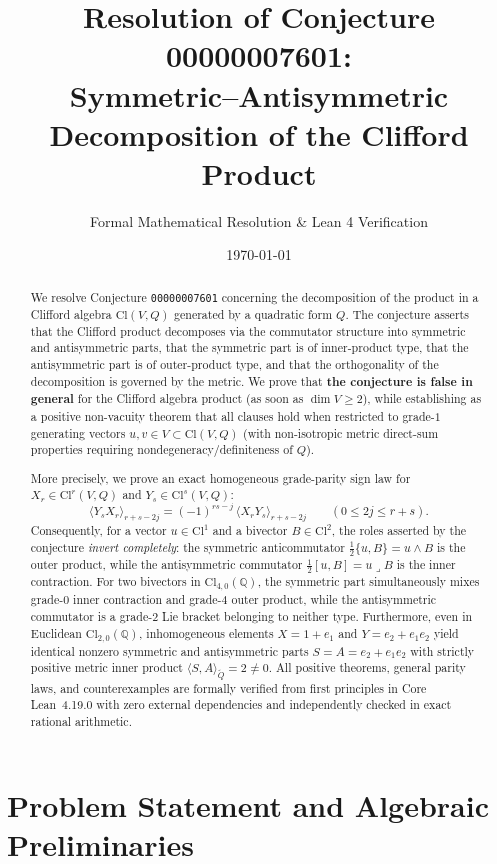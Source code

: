 \documentclass[11pt]{article}
\title{\textbf{Resolution of Conjecture 00000007601:\\
Symmetric--Antisymmetric Decomposition of the Clifford Product}}
\author{Formal Mathematical Resolution \& Lean 4 Verification}
\date{\today}
\theoremstyle{plain}
\theoremstyle{definition}
\theoremstyle{remark}
\newcommand{\Cl}{\mathrm{Cl}}
\newcommand{\grade}[2]{\langle #1 \rangle_{#2}}
\begin{document}
\maketitle

\begin{abstract}
We resolve Conjecture \texttt{00000007601} concerning the decomposition of the product in a Clifford algebra $\Cl(V, Q)$ generated by a quadratic form $Q$. The conjecture asserts that the Clifford product decomposes via the commutator structure into symmetric and antisymmetric parts, that the symmetric part is of inner-product type, that the antisymmetric part is of outer-product type, and that the orthogonality of the decomposition is governed by the metric. We prove that \textbf{the conjecture is false in general} for the Clifford algebra product (as soon as $\dim V \ge 2$), while establishing as a positive non-vacuity theorem that all clauses hold when restricted to grade-$1$ generating vectors $u, v \in V \subset \Cl(V, Q)$ (with non-isotropic metric direct-sum properties requiring nondegeneracy/definiteness of $Q$).

More precisely, we prove an exact homogeneous grade-parity sign law for $X_r \in \Cl^r(V, Q)$ and $Y_s \in \Cl^s(V, Q)$:
\[
  \grade{Y_s X_r}{r + s - 2j} = (-1)^{rs - j}\,\grade{X_r Y_s}{r + s - 2j}
  \qquad (0 \le 2j \le r + s).
\]
Consequently, for a vector $u \in \Cl^1$ and a bivector $B \in \Cl^2$, the roles asserted by the conjecture \emph{invert completely}: the symmetric anticommutator $\frac{1}{2}\{u, B\} = u \wedge B$ is the outer product, while the antisymmetric commutator $\frac{1}{2}[u, B] = u \lrcorner B$ is the inner contraction. For two bivectors in $\Cl_{4,0}(\mathbb{Q})$, the symmetric part simultaneously mixes grade-$0$ inner contraction and grade-$4$ outer product, while the antisymmetric commutator is a grade-$2$ Lie bracket belonging to neither type. Furthermore, even in Euclidean $\Cl_{2,0}(\mathbb{Q})$, inhomogeneous elements $X = 1 + e_1$ and $Y = e_2 + e_1 e_2$ yield identical nonzero symmetric and antisymmetric parts $S = A = e_2 + e_1 e_2$ with strictly positive metric inner product $\langle S, A \rangle_{\widetilde{Q}} = 2 \neq 0$. All positive theorems, general parity laws, and counterexamples are formally verified from first principles in Core Lean~4.19.0 with zero external dependencies and independently checked in exact rational arithmetic.
\end{abstract}

\section{Problem Statement and Algebraic Preliminaries}
\end{document}
